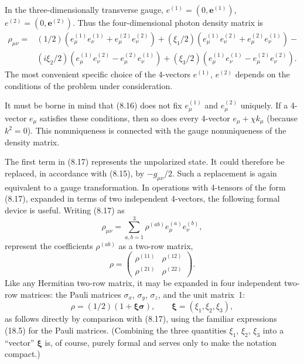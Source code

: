 In the three-dimensionally transverse gauge, $e^{(1)}=(0,\mathbf{e}^{(1)})$, $e^{(2)}=(0,\mathbf{e}^{(2)})$. Thus the four-dimensional photon density matrix is
\begin{equation}
\begin{split}
\rho_{\mu\nu}={}&(1/2)(e_\mu^{(1)}e_\nu^{(1)}+e_\mu^{(2)}e_\nu^{(2)})
+(\xi_1/2)(e_\mu^{(1)}e_\nu^{(2)}+e_\mu^{(2)}e_\nu^{(1)})-{}\\
&(i\xi_2/2)(e_\mu^{(1)}e_\nu^{(2)}-e_\mu^{(2)}e_\nu^{(1)})
+(\xi_3/2)(e_\mu^{(1)}e_\nu^{(1)}-e_\mu^{(2)}e_\nu^{(2)}).
\end{split}
\tag{8.17}
\end{equation}
The most convenient specific choice of the 4-vectors $e^{(1)}$, $e^{(2)}$ depends on the conditions of the problem under consideration.

It must be borne in mind that (8.16) does not fix $e_\mu^{(1)}$ and $e_\mu^{(2)}$ uniquely. If a 4-vector $e_\mu$ satisfies these conditions, then so does every 4-vector $e_\mu+\chi k_\mu$ (because $k^2=0$). This nonuniqueness is connected with the gauge nonuniqueness of the density matrix.

The first term in (8.17) represents the unpolarized state. It could therefore be replaced, in accordance with (8.15), by $-g_{\mu\nu}/2$. Such a replacement is again equivalent to a gauge transformation. In operations with 4-tensors of the form (8.17), expanded in terms of two independent 4-vectors, the following formal device is useful. Writing (8.17) as
\[
\rho_{\mu\nu}=\sum_{a,b=1}^{3}\rho^{(ab)}e_\mu^{(a)}e_\nu^{(b)},
\]
represent the coefficients $\rho^{(ab)}$ as a two-row matrix,
\[
\rho=
\begin{pmatrix}
\rho^{(11)} & \rho^{(12)}\\
\rho^{(21)} & \rho^{(22)}
\end{pmatrix}.
\]
Like any Hermitian two-row matrix, it may be expanded in four independent two-row matrices: the Pauli matrices $\sigma_x$, $\sigma_y$, $\sigma_z$, and the unit matrix~1:
\begin{equation}
\rho=(1/2)(1+\boldsymbol{\xi}\boldsymbol{\sigma}),
\qquad
\boldsymbol{\xi}=(\xi_1,\xi_2,\xi_3),
\tag{8.18}
\end{equation}
as follows directly by comparison with (8.17), using the familiar expressions (18.5) for the Pauli matrices. (Combining the three quantities $\xi_1$, $\xi_2$, $\xi_3$ into a ``vector'' $\boldsymbol{\xi}$ is, of course, purely formal and serves only to make the notation compact.)

